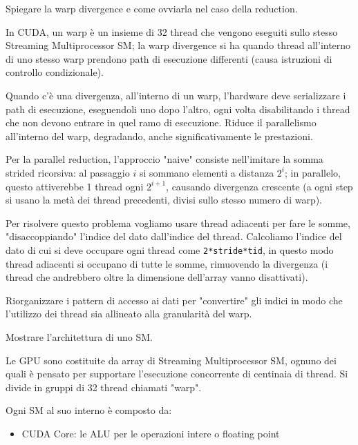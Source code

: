 \documentclass[12pt, answers]{exam}
\begin{document}
\begin{questions}
    \question Spiegare la warp divergence e come ovviarla nel caso della reduction.
    
    \begin{solution}
        In CUDA, un warp è un insieme di 32 thread che vengono eseguiti sullo stesso Streaming Multiprocessor SM; la warp divergence si ha quando thread all'interno di uno stesso warp prendono path di esecuzione differenti (causa istruzioni di controllo condizionale).
        
        Quando c'è una divergenza, all'interno di un warp, l'hardware deve serializzare i path di esecuzione, eseguendoli uno dopo l'altro, ogni volta disabilitando i thread che non devono entrare in quel ramo di esecuzione. Riduce il parallelismo all'interno del warp, degradando, anche significativamente le prestazioni.
        
        Per la parallel reduction, l'approccio "naive" consiste nell'imitare la somma strided ricorsiva: al passaggio $i$ si sommano elementi a distanza $2^i$; in parallelo, questo attiverebbe 1 thread ogni $2^{i+1}$, causando divergenza crescente (a ogni step si usano la metà dei thread precedenti, divisi sullo stesso numero di warp).
        
        Per risolvere questo problema vogliamo usare thread adiacenti per fare le somme, "disaccoppiando" l'indice del dato dall'indice del thread. Calcoliamo l'indice del dato di cui si deve occupare ogni thread come \texttt{2*stride*tid}, in questo modo thread adiacenti si occupano di tutte le somme, rimuovendo la divergenza (i thread che andrebbero oltre la dimensione dell'array vanno disattivati).
        
        Riorganizzare i pattern di accesso ai dati per "convertire" gli indici in modo che l'utilizzo dei thread sia allineato alla granularità del warp.
    \end{solution}
    
    \question Mostrare l'architettura di uno SM.
    
    \begin{solution}
        Le GPU sono costituite da array di Streaming Multiprocessor SM, ognuno dei quali è pensato per supportare l'esecuzione concorrente di centinaia di thread. Si divide in gruppi di 32 thread chiamati "warp".
        
        Ogni SM al suo interno è composto da: 
        \begin{itemize}
            \item CUDA Core: le ALU per le operazioni intere o floating point
            

\end{itemize}
\end{solution}
\end{questions}
\end{document}
